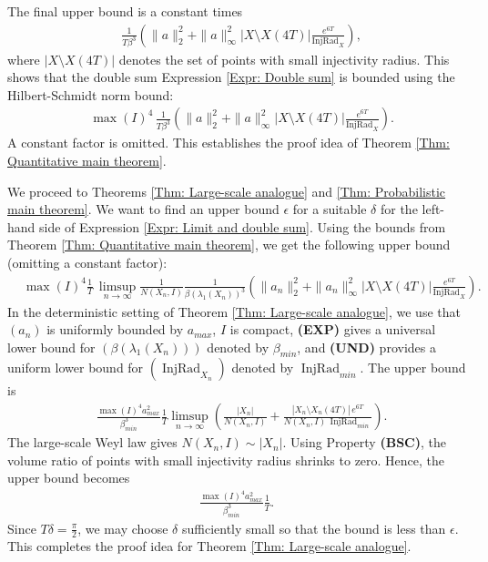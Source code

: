 \documentclass[11pt,twoside,reqno]{amsart} \usepackage{a4wide} \usepackage[T1]{fontenc} \usepackage[utf8]{inputenc} \usepackage{soul}  \usepackage{amsmath} \usepackage{amsfonts} \usepackage{amssymb} \usepackage{mathtools} \usepackage{amsthm} \usepackage{xcolor} \usepackage{graphicx} \usepackage{hyperref} \usepackage{standalone} \usepackage{esint} \usepackage{comment} \usepackage[left=2.3cm,top=3cm,right=2.3cm]{geometry} \usepackage{bm} \usepackage{svg} \usepackage{float} \numberwithin{equation}{section} \theoremstyle{plain} \newtheorem{thm}{Theorem}[section] \newtheorem{theorem}[thm]{Theorem} \newtheorem*{theorem*}{Theorem}\newtheorem{conj}[thm]{Conjecture} \newtheorem{lemma}[thm]{Lemma} \newtheorem{prop}[thm]{Proposition} \newtheorem{proposition}[thm]{Proposition} \newtheorem{cor}[thm]{Corollary} \newtheorem{question}[thm]{Question} \newtheorem{corollary}[thm]{Corollary} \newtheorem{assumption}[thm]{Assumption} \theoremstyle{definition} \newtheorem{defn}[thm]{Definition} \newtheorem{choice}[thm]{Choice} \newtheorem{definition}[thm]{Definition} \newtheorem{ex}[thm]{Example} \newtheorem{notation}[thm]{Notation} \newtheorem*{ack}{Acknowledgements} \theoremstyle{remark} \newtheorem{remark}[thm]{Remark} \newtheorem{bigremark}[thm]{Remark} \usepackage{xcolor} \newcommand{\red}[1]{ {\color{Red}#1} } \newcommand{\blue}[1]{ {\color{Blue}#1} } \author{Kai Hippi} \address{Aalto University, Espoo, Finland} \email{kai.hippi@aalto.fi}
\begin{document}
The final upper bound is a constant times
\begin{align*}
	&
	\frac{1}{T \beta^{3}} \left( \| a \|_{2}^{2} + \| a \|_{\infty}^{2} | X \setminus X( 4T ) | \frac{ e^{6T} }{ \operatorname{InjRad}_{X} }  \right),	
\end{align*}
where $ | X \setminus X( 4T ) | $ denotes the set of points with small injectivity radius. This shows that the double sum Expression \eqref{Expr: Double sum} is bounded using the Hilbert-Schmidt norm bound:
\begin{align*}
	&
	\max( I )^{4} \, \frac{1}{T \beta^{3}} \left( \| a \|_{2}^{2} + \| a \|_{\infty}^{2} | X \setminus X( 4T ) | \frac{ e^{6T} }{ \operatorname{InjRad}_{X} }  \right).
\end{align*}
A constant factor is omitted. This establishes the proof idea of Theorem \ref{Thm: Quantitative main theorem}.

We proceed to Theorems \ref{Thm: Large-scale analogue} and \ref{Thm: Probabilistic main theorem}. We want to find an upper bound $ \epsilon $ for a suitable $ \delta $ for the left-hand side of Expression \eqref{Expr: Limit and double sum}. Using the bounds from Theorem \ref{Thm: Quantitative main theorem}, we get the following upper bound (omitting a constant factor):
\begin{align}
	&
	\label{Expr: Works both deterministic and probabilistic}
	\max( I )^{4} \frac{1}{T} \, \limsup_{n \to \infty} \frac{1}{N( X_{n}, I )} \frac{1}{ \beta( \lambda_{1}( X_{n} ) )^{3} } \left( \| a_{n} \|_{2}^{2} + \| a_{n} \|_{\infty}^{2} | X \setminus X( 4T ) | \frac{ e^{6T} }{ \operatorname{InjRad}_{X} }  \right).
\end{align}
In the deterministic setting of Theorem \ref{Thm: Large-scale analogue}, we use that $ ( a_{n} ) $ is uniformly bounded by $ a_{max} $, $ I $ is compact, \textbf{(EXP)} gives a universal lower bound for $ ( \beta(\lambda_{1}( X_{n} ) ) ) $ denoted by $ \beta_{min} $, and \textbf{(UND)} provides a uniform lower bound for $ ( \operatorname{InjRad}_{X_{n}} ) $ denoted by $ \operatorname{InjRad}_{min} $. The upper bound is
\begin{align*}
	&
	\frac{ \max( I )^{4}  a_{max}^{2} }{ \beta_{min}^{3} } \frac{1}{T} \limsup_{n \to \infty} \left( \frac{ |X_{n}| }{ N( X_{n}, I ) } + \frac{ |X_{n} \setminus X_{n}( 4T )| \, e^{6T} }{ N( X_{n}, I  ) \, \operatorname{InjRad}_{min}  } \right).
\end{align*}
The large-scale Weyl law gives $ N( X_{n}, I ) \sim | X_{n} | $. Using Property \textbf{(BSC)}, the volume ratio of points with small injectivity radius shrinks to zero. Hence, the upper bound becomes
\begin{align*}
	 \frac{ \max( I )^{4} a_{max}^{2}  }{ \beta_{min}^{3} } \frac{1}{T}.
\end{align*}
Since \(T\delta=\tfrac{\pi}{2}\), we may choose \(\delta\) sufficiently small so that the bound is less than \(\epsilon\). This completes the proof idea for Theorem \ref{Thm: Large-scale analogue}.
\end{document}
